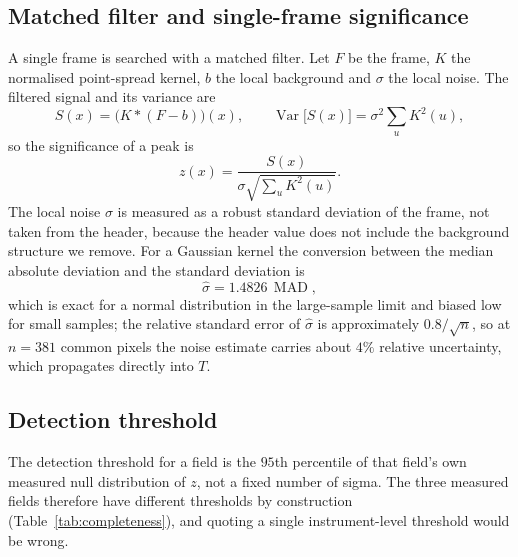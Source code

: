 \documentclass[11pt,a4paper]{article}
\begin{document}
\subsection{Matched filter and single-frame significance}
A single frame is searched with a matched filter. Let $F$ be the frame, $K$ the
normalised point-spread kernel, $b$ the local background and $\sigma$ the local
noise. The filtered signal and its variance are
\begin{equation}
S(x) = \big(K * (F - b)\big)(x), \qquad
\operatorname{Var}\big[S(x)\big] = \sigma^{2}\sum_{u} K^{2}(u),
\label{eq:filter}
\end{equation}
so the significance of a peak is
\begin{equation}
z(x) = \frac{S(x)}{\sigma\sqrt{\sum_u K^{2}(u)}} .
\label{eq:z}
\end{equation}
The local noise $\sigma$ is measured as a robust standard deviation of the frame,
not taken from the header, because the header value does not include the
background structure we remove. For a Gaussian kernel the conversion between the
median absolute deviation and the standard deviation is
\begin{equation}
\hat\sigma = 1.4826\,\operatorname{MAD},
\label{eq:mad}
\end{equation}
which is exact for a normal distribution in the large-sample limit and biased low
for small samples; the relative standard error of $\hat\sigma$ is approximately
$0.8/\sqrt{n}$, so at $n=381$ common pixels the noise estimate carries about
$4\%$ relative uncertainty, which propagates directly into $T$.

\subsection{Detection threshold}
The detection threshold for a field is the $95$th percentile of that field's own
measured null distribution of $z$, not a fixed number of sigma. The three measured
fields therefore have different thresholds by construction
(Table~\ref{tab:completeness}), and quoting a single instrument-level threshold
would be wrong.
\end{document}
